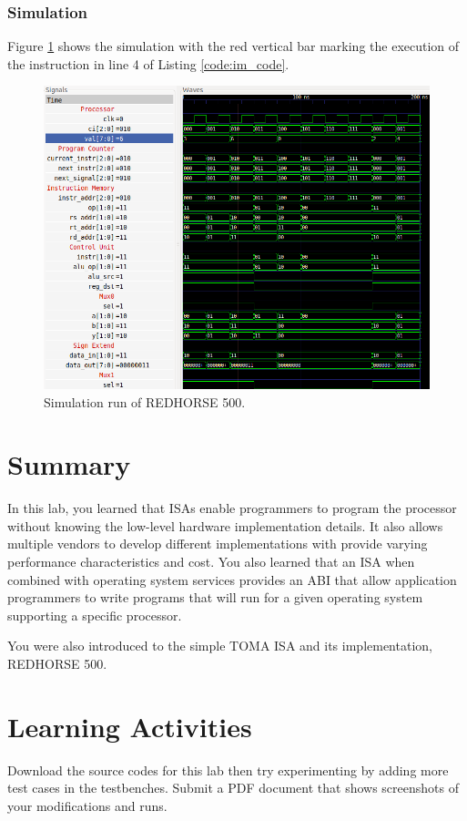 \documentclass[a4paper, 11pt,oneside]{article}
\begin{document}
\subsubsection{Simulation}
Figure \ref{fig:sim} shows the simulation with the red vertical bar marking the 
execution of the instruction in line 4 of Listing \ref{code:im_code}.

\begin{figure}[H]
	\begin{center}
	\includegraphics[width=6in]{sim.png}
	\caption{Simulation run of REDHORSE 500.}
	\label{fig:sim} 
	\end{center}
\end{figure}


\section{Summary}
In this lab, you learned that ISAs enable programmers to program the processor 
without knowing the low-level hardware implementation details. It also allows 
multiple vendors to develop different implementations with provide varying  
performance characteristics and cost. You also learned that an ISA when 
combined with operating system services provides an ABI that allow application 
programmers to write programs that will run for a given operating system 
supporting a specific processor.

You were also introduced to the simple TOMA ISA and its implementation, 
REDHORSE 500.

\section{Learning Activities}
Download the source codes for this lab then try experimenting by adding more 
test cases in the testbenches. Submit a PDF document that shows screenshots of 
your modifications and runs. 
\end{document}
